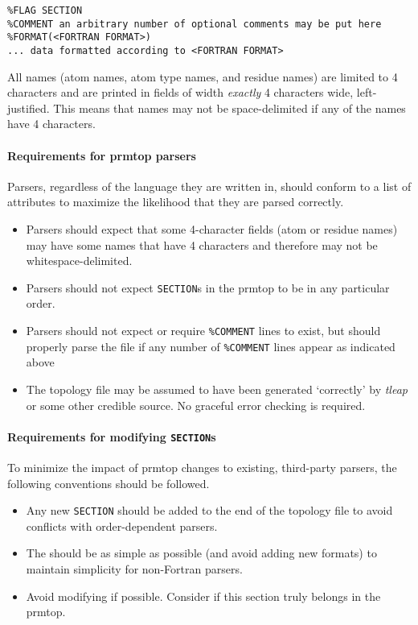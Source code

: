 \begin{verbatim}
%FLAG SECTION
%COMMENT an arbitrary number of optional comments may be put here
%FORMAT(<FORTRAN FORMAT>)
... data formatted according to <FORTRAN FORMAT>
\end{verbatim}

All names (\eg atom names, atom type names, and residue names) are limited to
4 characters and are printed in fields of width \emph{exactly} 4 characters
wide, left-justified. This means that names may not be space-delimited if any of
the names have 4 characters.

\paragraph{Requirements for prmtop parsers}

Parsers, regardless of the language they are written in, should conform to a
list of attributes to maximize the likelihood that they are parsed correctly.

\begin{itemize}
   \item Parsers should expect that some 4-character fields (\eg atom or residue
         names) may have some names that have 4 characters and therefore may not
         be whitespace-delimited.
   \item Parsers should not expect {\tt SECTION}s in the prmtop to be in any
         particular order.
   \item Parsers should not expect or require {\tt \%COMMENT} lines to exist,
         but should properly parse the file if any number of {\tt \%COMMENT}
         lines appear as indicated above
   \item The topology file may be assumed to have been generated `correctly' by
         \emph{tleap} or some other credible source. No graceful error checking
         is required.
\end{itemize}

\paragraph{Requirements for modifying {\tt SECTION}s}

To minimize the impact of prmtop changes to existing, third-party parsers, the
following conventions should be followed.

\begin{itemize}
   \item Any new {\tt SECTION} should be added to the end of the topology file to
         avoid conflicts with order-dependent parsers.
   \item The {\tt <FORTRAN FORMAT>} should be as simple as possible (and avoid
         adding new formats) to maintain simplicity for non-Fortran parsers.
   \item Avoid modifying if possible. Consider if this section truly belongs in
         the prmtop.
\end{itemize}

